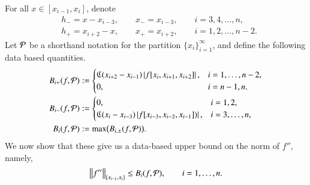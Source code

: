 \documentclass[review]{elsarticle}
\theoremstyle{definition}
\begin{document}
For all $ x \in [x_{i-1},x_i]$,  denote
\begin{align*}
&h_- = x - x_{i-3}, \qquad x_- = x_{i-3},  \qquad i=3,4,\ldots,n,\\
 &h_+ = x_{i+2} - x, \qquad x_+ =  x_{i+2}, \qquad i=1,2,\ldots,n-2.
\end{align*}
Let $\cp$ be a shorthand notation for the partition $\{x_i\}_{i=1}^\infty$, and define the following data based quantities.
\begin{align}\label{bpf}
B_{i+}(f,\cp)&:=\begin{cases}
    \fC(x_{i+2}-x_{i-1})\abs{f[x_i,x_{i+1},x_{i+2}]},  & i=1,\ldots,n-2,
\\ 0, & i=n-1,n.
\end{cases} \\
\label{bmf}
 B_{i-}(f,\cp)&: =\begin{cases}
   0,  & i=1,2,
\\ \fC(x_{i}-x_{i-3})\abs{f[x_{i-3},x_{i-2},x_{i-1}])}, & i=3,\ldots,n,
\end{cases} \\
\nonumber
B_i(f,\cp) & : = \max\bigl(B_{i,\pm}(f,\cp) \bigr).
\end{align}
We now show that these give us a data-based upper bound on the norm of $f''$, namely,
\begin{equation}\label{normbd}
\norm[{[x_{i-1},x_i]}]{f''} \le B_i(f,\cp), \qquad i =1, \ldots, n.
\end{equation}
\end{document}

